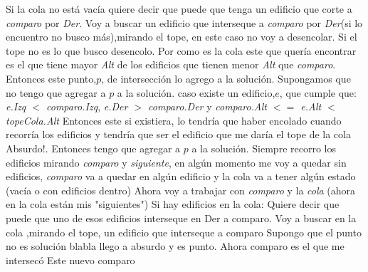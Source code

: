 \documentclass{article}
\begin{document}
\color{red}{(cola vacia grafico)} \color{black} \newline
\color{red}{falta demo} \color{black} \newline
        Si la cola no está vacía quiere decir que puede que tenga un edificio que corte a \textit{comparo} por \textit{Der}.
\color{red}{Grafico que corte a comparo}\color{black} \newline
                Voy a buscar un edificio que interseque a \textit{comparo} por \textit{Der}(si lo encuentro no busco más),mirando el tope, en este caso no voy a desencolar. Si el tope no es lo que busco desencolo. \newline
                Por como es la cola este que quería encontrar es el que tiene mayor \textit{Alt} de los edificios que tienen menor \textit{Alt} que \textit{comparo}.
                Entonces este punto,$p$, de intersección lo agrego a la solución.\newline
                Supongamos que no tengo que agregar a $p$ a la solución.\newline
                caso existe un edificio,$e$, que cumple que: \textit{e.Izq $<$ comparo.Izq}, \textit{e.Der $>$ comparo.Der} y \newline
                \textit{comparo.Alt $<=$ e.Alt $<$ topeCola.Alt} \newline
\color{red}{(grafico E)} \color{black} \newline          
                 Entonces este si existiera, lo tendría que haber encolado cuando recorría los edificios y tendría que ser el edificio que me daría el tope de la cola Absurdo!. Entonces tengo que agregar a $p$ a la solución.\newline
Siempre recorro los edificios mirando \textit{comparo} y \textit{siguiente}, en algún momento me voy a quedar sin edificios, \textit{comparo} va a quedar en algún edificio y la cola va a tener algún estado (vacía o con edificios dentro) \newline
\color{red}{ejemplos de estados de la cola}\color{black}\newline
Ahora voy a trabajar con \textit{comparo} y la \textit{cola} (ahora en la cola están mis "siguientes")
Si hay edificios en la cola:
Quiere decir que puede que uno de esos edificios interseque en Der a comparo.
Voy a buscar en la cola ,mirando el tope, un edificio  que interseque a comparo
Supongo que el punto no es solución blabla llego a absurdo y es punto.
Ahora comparo es el que me intersecó 
Este nuevo comparo  
\end{document}
